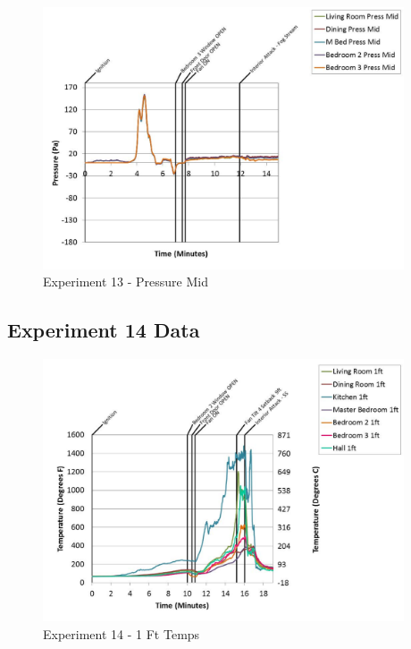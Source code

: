 \documentclass{article}
\begin{document}
\begin{appendices}
	\clearpage

	\begin{figure}[h!]
		\centering
		\includegraphics[height=3.05in]{0_Images/Results_Charts/Exp_13_Charts/PressureMid.pdf}
		\caption{Experiment 13 - Pressure Mid}
	\end{figure}
 

		\clearpage
\clearpage		\large
\subsection{Experiment 14 Data} \label{App:Exp14Results} 

	\begin{figure}[h!]
		\centering
		\includegraphics[height=3.05in]{0_Images/Results_Charts/Exp_14_Charts/1FtTemps.pdf}
		\caption{Experiment 14 - 1 Ft Temps}
	\end{figure}
 


\end{appendices}
\end{document}
